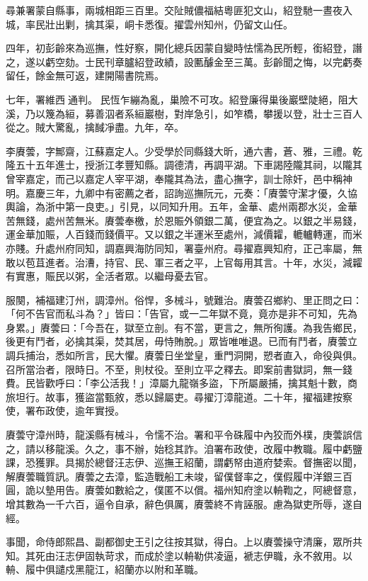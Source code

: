 \begin{pinyinscope}
尋兼署蒙自縣事，兩城相距三百里。交阯賊儂福結粵匪犯文山，紹登馳一晝夜入城，率民壯出剿，擒其渠，峒卡悉復。擢雲州知州，仍留文山任。

四年，初彭齡來為巡撫，性好察，開化總兵因蒙自變時怯懦為民所輕，銜紹登，譖之，遂以虧空劾。士民刊章臚紹登政績，設匭醵金至三萬。彭齡聞之悔，以完虧奏留任，餘金無可返，建開陽書院焉。

七年，署維西通判。民恆乍繃為亂，巢險不可攻。紹登廉得巢後巖壁陡絕，阻大溪，乃以篾為絙，募善泅者系絙巖樹，對岸急引，如笮橋，攀援以登，壯士三百人從之。賊大驚亂，擒馘凈盡。九年，卒。

李賡蕓，字鄦齋，江蘇嘉定人。少受學於同縣錢大昕，通六書，蒼、雅，三禮。乾隆五十五年進士，授浙江孝豐知縣。調德清，再調平湖。下車謁陸隴其祠，以隴其曾宰嘉定，而己以嘉定人宰平湖，奉隴其為法，盡心撫字，訓士除奸，邑中稱神明。嘉慶三年，九卿中有密薦之者，詔詢巡撫阮元，元奏：「賡蕓守潔才優，久協輿論，為浙中第一良吏。」引見，以同知升用。五年，金華、處州兩郡水災，金華苦無錢，處州苦無米。賡蕓奉檄，於恩賑外領銀二萬，便宜為之。以銀之半易錢，運金華加賑，人百錢而錢價平。又以銀之半運米至處州，減價糶，轆轤轉運，而米亦賤。升處州府同知，調嘉興海防同知，署臺州府。尋擢嘉興知府，正己率屬，無敢以苞苴進者。治漕，持官、民、軍三者之平，上官每用其言。十年，水災，減糶有實惠，賑民以粥，全活者眾。以繼母憂去官。

服闋，補福建汀州，調漳州。俗悍，多械斗，號難治。賡蕓召鄉約、里正問之曰：「何不告官而私斗為？」皆曰：「告官，或一二年獄不竟，竟亦是非不可知，先為身累。」賡蕓曰：「今吾在，獄至立剖。有不當，更言之，無所徇護。為我告鄉民，後更有鬥者，必擒其渠，焚其居，毋恃賄脫。」眾皆唯唯退。已而有鬥者，賡蕓立調兵捕治，悉如所言，民大懼。賡蕓日坐堂皇，重門洞開，愬者直入，命役與俱。召所當治者，限時日。不至，則杖役。至則立平之釋去。即案前書獄詞，無一錢費。民皆歡呼曰：「李公活我！」漳屬九龍嶺多盜，下所屬嚴捕，擒其魁十數，商旅坦行。故事，獲盜當甄敘，悉以歸屬吏。尋擢汀漳龍道。二十年，擢福建按察使，署布政使，逾年實授。

賡蕓守漳州時，龍溪縣有械斗，令懦不治。署和平令硃履中內狡而外樸，庚蕓誤信之，請以移龍溪。久之，事不辦，始稔其詐。洎署布政使，改履中教職。履中虧鹽課，恐獲罪。具揭於總督汪志伊、巡撫王紹蘭，謂虧帑由道府婪索。督撫密以聞，解賡蕓職質訊。賡蕓之去漳，監造戰船工未竣，留僕督率之，僕假履中洋銀三百圓，詭以墊用告。賡蕓如數給之，僕匿不以償。福州知府塗以輈鞫之，阿總督意，增其數為一千六百，逼令自承，辭色俱厲，賡蕓終不肯誣服。慮為獄吏所辱，遂自經。

事聞，命侍郎熙昌、副都御史王引之往按其獄，得白。上以賡蕓操守清廉，眾所共知。其死由汪志伊固執苛求，而成於塗以輈勒供凌逼，褫志伊職，永不敘用。以輈、履中俱譴戍黑龍江，紹蘭亦以附和革職。


\end{pinyinscope}

